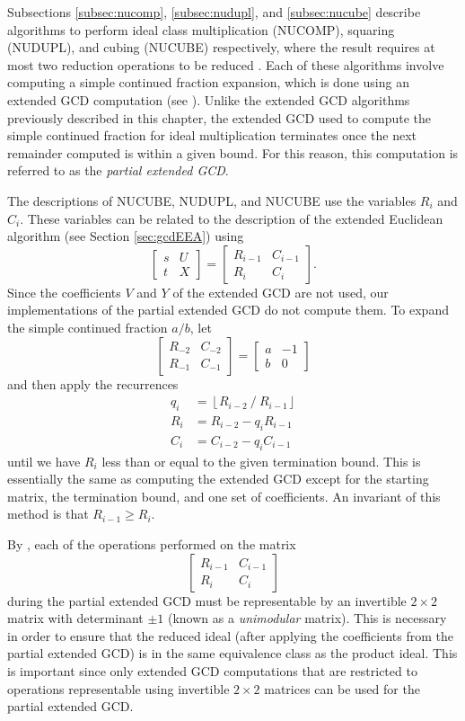 \documentclass{ucalgthes1}
\theoremstyle{definition}
\newcommand{\matrixtt}[4]{\left[ \begin{array}{rr} #1 & #2 \\ #3 & #4 \end{array} \right]}
\newcommand{\floor}[1]{\left\lfloor #1 \right\rfloor}
\begin{document}
Subsections \ref{subsec:nucomp}, \ref{subsec:nudupl}, and \ref{subsec:nucube} describe algorithms to perform ideal class multiplication (NUCOMP), squaring (NUDUPL), and cubing (NUCUBE) respectively, where the result requires at most two reduction operations to be reduced \cite[p.122]{Jacobson2009}.  Each of these algorithms involve computing a simple continued fraction expansion, which is done using an extended GCD computation (see \cite[\S 3.2]{Jacobson2009}).  Unlike the extended GCD algorithms previously described in this chapter, the extended GCD used to compute the simple continued fraction for ideal multiplication terminates once the next remainder computed is within a given bound.  For this reason, this computation is referred to as the \emph{partial extended GCD}.

The descriptions of NUCUBE, NUDUPL, and NUCUBE use the variables $R_i$ and $C_i$.  These variables can be related to the description of the extended Euclidean algorithm (see Section \ref{sec:gcdEEA}) using
\[
	\matrixtt{s}{U}{t}{X} = \matrixtt{R_{i-1}}{C_{i-1}}{R_i}{C_i}.
\]
Since the coefficients $V$ and $Y$ of the extended GCD are not used, our implementations of the partial extended GCD do not compute them.
To expand the simple continued fraction $a/b$, let
\[
\matrixtt{R_{-2}}{C_{-2}}{R_{-1}}{C_{-1}} = \matrixtt{a}{-1}{b}{0}
\]
and then apply the recurrences
\begin{align*}
	q_i &= \floor{R_{i-2} ~/~ R_{i-1}} \\
	R_i &= R_{i-2} - q_i R_{i-1} \\
	C_i &= C_{i-2} - q_i C_{i-1}
\end{align*}
until we have $R_i$ less than or equal to the given termination bound.  This is essentially the same as computing the extended GCD except for the starting matrix, the termination bound, and one set of coefficients.  An invariant of this method is that $R_{i-1} \ge R_i$.

By \cite[\S 5.6.1]{Crandall2001}, each of the operations performed on the matrix
\[
\matrixtt{R_{i-1}}{C_{i-1}}{R_i}{C_i}
\]
during the partial extended GCD must be representable by an invertible $2 \times 2$ matrix with determinant $\pm 1$ (known as a \emph{unimodular} matrix).  This is necessary in order to ensure that the reduced ideal (after applying the coefficients from the partial extended GCD) is in the same equivalence class as the product ideal.  This is important since only extended GCD computations that are restricted to operations representable using invertible $2 \times 2$ matrices can be used for the partial extended GCD.
\end{document}
